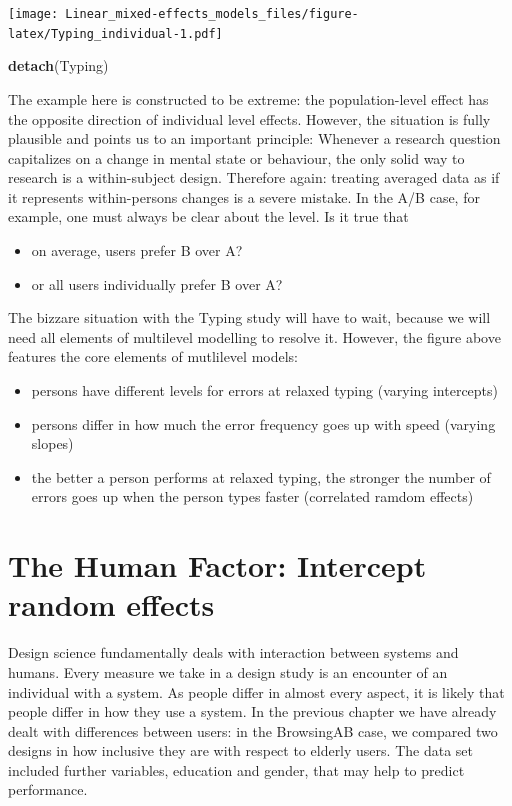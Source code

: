 \documentclass[]{svmono}
\newenvironment{Shaded}{\begin{snugshade}}{\end{snugshade}}
\newcommand{\KeywordTok}[1]{\textcolor[rgb]{0.13,0.29,0.53}{\textbf{#1}}}
\newcommand{\NormalTok}[1]{#1}
\providecommand{\tightlist}{%
  \setlength{\itemsep}{0pt}\setlength{\parskip}{0pt}}
\theoremstyle{definition}
\theoremstyle{definition}
\theoremstyle{definition}
\theoremstyle{remark}
\begin{document}
\texttt{[image: Linear\_mixed-effects\_models\_files/figure-latex/Typing\_individual-1.pdf]}

\begin{Shaded}
\begin{Highlighting}[]
\KeywordTok{detach}\NormalTok{(Typing)}
\end{Highlighting}
\end{Shaded}

The example here is constructed to be extreme: the population-level
effect has the opposite direction of individual level effects. However,
the situation is fully plausible and points us to an important
principle: Whenever a research question capitalizes on a change in
mental state or behaviour, the only solid way to research is a
within-subject design. Therefore again: treating averaged data as if it
represents within-persons changes is a severe mistake. In the A/B case,
for example, one must always be clear about the level. Is it true that

\begin{itemize}
\tightlist
\item
  on average, users prefer B over A?
\item
  or all users individually prefer B over A?
\end{itemize}

The bizzare situation with the Typing study will have to wait, because
we will need all elements of multilevel modelling to resolve it.
However, the figure above features the core elements of mutlilevel
models:

\begin{itemize}
\tightlist
\item
  persons have different levels for errors at relaxed typing (varying
  intercepts)
\item
  persons differ in how much the error frequency goes up with speed
  (varying slopes)
\item
  the better a person performs at relaxed typing, the stronger the
  number of errors goes up when the person types faster (correlated
  ramdom effects)
\end{itemize}

\section{The Human Factor: Intercept random
effects}\label{the-human-factor-intercept-random-effects}

Design science fundamentally deals with interaction between systems and
humans. Every measure we take in a design study is an encounter of an
individual with a system. As people differ in almost every aspect, it is
likely that people differ in how they use a system. In the previous
chapter we have already dealt with differences between users: in the
BrowsingAB case, we compared two designs in how inclusive they are with
respect to elderly users. The data set included further variables,
education and gender, that may help to predict performance.
\end{document}
